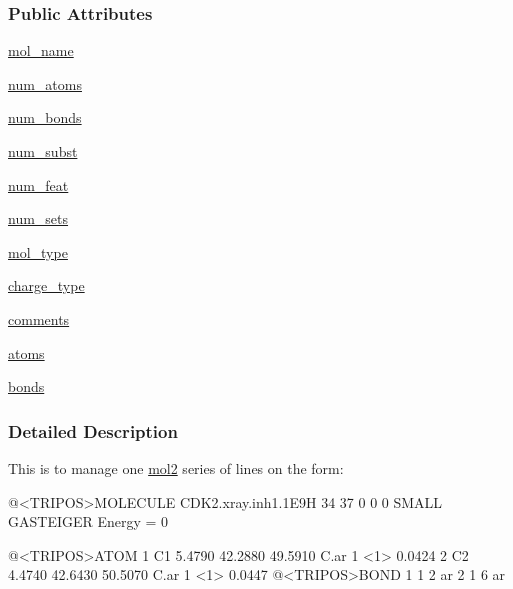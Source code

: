 \subsubsection*{\-Public \-Attributes}
\begin{DoxyCompactItemize}
\item 
\hyperlink{classforcebalance_1_1Mol2_1_1mol2_aaa3cf198c54e06b424910a39837b1793}{mol\-\_\-name}
\item 
\hyperlink{classforcebalance_1_1Mol2_1_1mol2_a7989de59555594c8532f02c204b0d358}{num\-\_\-atoms}
\item 
\hyperlink{classforcebalance_1_1Mol2_1_1mol2_a096690c7f846372ffe0bc716c22e17c0}{num\-\_\-bonds}
\item 
\hyperlink{classforcebalance_1_1Mol2_1_1mol2_ae7ec89e16d022a11bd0f8e663c303ead}{num\-\_\-subst}
\item 
\hyperlink{classforcebalance_1_1Mol2_1_1mol2_a3fa0a0c026cff4e92a724f7fd1f6b23c}{num\-\_\-feat}
\item 
\hyperlink{classforcebalance_1_1Mol2_1_1mol2_a1a36cf6ccaea1f56aab925d994350f74}{num\-\_\-sets}
\item 
\hyperlink{classforcebalance_1_1Mol2_1_1mol2_a7f6834cad9660e097e91887e485eb2ca}{mol\-\_\-type}
\item 
\hyperlink{classforcebalance_1_1Mol2_1_1mol2_a44fd3788706de797b2f5d60407e77a50}{charge\-\_\-type}
\item 
\hyperlink{classforcebalance_1_1Mol2_1_1mol2_a27fb0e4eaa5fd1638f24c6da8a1a355d}{comments}
\item 
\hyperlink{classforcebalance_1_1Mol2_1_1mol2_aa2ad4051d28735ecbfaf26b2acaaeae2}{atoms}
\item 
\hyperlink{classforcebalance_1_1Mol2_1_1mol2_a7740f63859ce71c82e3efe020ea7e449}{bonds}
\end{DoxyCompactItemize}


\subsubsection{\-Detailed \-Description}
\-This is to manage one \hyperlink{classforcebalance_1_1Mol2_1_1mol2}{mol2} series of lines on the form\-: 

\begin{DoxyVerb}
 @<TRIPOS>MOLECULE
 CDK2.xray.inh1.1E9H
  34 37 0 0 0
 SMALL
 GASTEIGER
 Energy = 0
 
 @<TRIPOS>ATOM
       1 C1          5.4790   42.2880   49.5910 C.ar    1  <1>         0.0424
       2 C2          4.4740   42.6430   50.5070 C.ar    1  <1>         0.0447
 @<TRIPOS>BOND
      1     1     2   ar
      2     1     6   ar
 
     \end{DoxyVerb}
 


